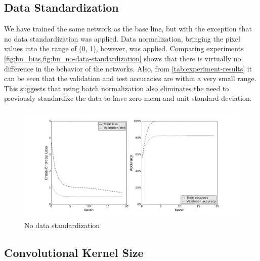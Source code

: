 \documentclass[a4paper, 11pt]{article}
\begin{document}
\clearpage

\subsection{Data Standardization} \label{sec:data}

We have trained the same network as the base line, but with the exception that no data standardization was applied.
Data normalization, bringing the pixel values into the range of (0, 1), however, was applied.
Comparing experiments \cref{fig:bn_bias,fig:bn_no-data-standardization} shows that there is virtually no difference in the behavior of the networks.
Also, from \cref{tab:experiment-results} it can be seen that the validation and test accuracies are within a very small range.
This suggests that using batch normalization also eliminates the need to previously standardize the data to have zero mean and unit standard deviation.

\begin{figure}[H]
	\includegraphics[width=\linewidth]{no-data-standardization.png}
	\caption{No data standardization }
	\label{fig:bn_no-data-standardization}
\end{figure}

\clearpage

\subsection{Convolutional Kernel Size} \label{sec:kernel}
\end{document}
